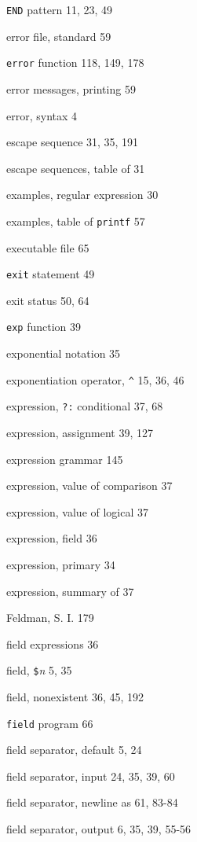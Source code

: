 \begin{multicols}{2}
\verb'END' pattern 11, 23, 49

error file, standard 59

\verb'error' function 118, 149, 178

error messages, printing 59

error, syntax 4

escape sequence 31, 35, 191

escape sequences, table of 31

examples, regular expression 30

examples, table of \verb'printf' 57

executable file 65

\verb'exit' statement 49

exit status 50, 64

\verb'exp' function 39

exponential notation 35

exponentiation operator, \verb'^' 15, 36, 46

expression, \verb'?:' conditional 37, 68

expression, assignment 39, 127

expression grammar 145

expression, value of comparison 37

expression, value of logical 37

expression, field 36

expression, primary 34

expression, summary of 37

Feldman, S. I. 179

field expressions 36

field, \verb'$'\textit{n} 5, 35

field, nonexistent 36, 45, 192

\verb'field' program 66

field separator, default 5, 24

field separator, input 24, 35, 39, 60

field separator, newline as 61, 83-84

field separator, output 6, 35, 39, 55-56
\end{multicols}
